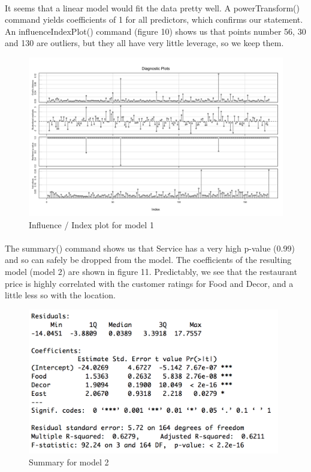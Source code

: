 \documentclass{article}
\begin{document}
\paragraph{}
It seems that a linear model would fit the data pretty well. A powerTransform() command yields coefficients of 1 for all predictors, which confirms our statement. An influenceIndexPlot() command (figure 10) shows us that points number 56, 30 and 130 are outliers, but they all have very little leverage, so we keep them. 

\begin{figure}[h!]				
	\centering
	\includegraphics[width=13cm]{Part2_influenceplot}
	\caption{Influence / Index plot for model 1}
\end{figure}

\paragraph{}
The summary() command shows us that Service has a very high p-value (0.99) and so can safely be dropped from the model. The coefficients of the resulting model (model 2) are shown in figure 11. Predictably, we see that the restaurant price is highly correlated with the customer ratings for Food and Decor, and a little less so with the location.

\begin{figure}[h!]				
	\centering
	\includegraphics[width=11cm]{Part2_summaryminusservice}
	\caption{Summary for model 2}
\end{figure}
\end{document}

